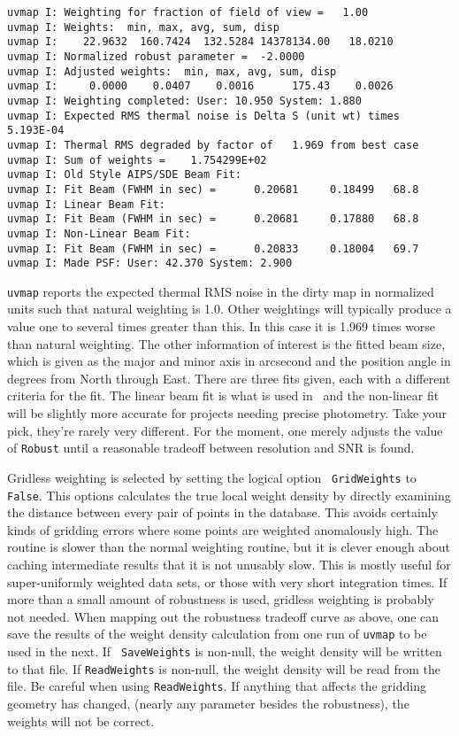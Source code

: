 \begin{verbatim}
uvmap I: Weighting for fraction of field of view =   1.00
uvmap I: Weights:  min, max, avg, sum, disp
uvmap I:    22.9632  160.7424  132.5284 14378134.00   18.0210
uvmap I: Normalized robust parameter =  -2.0000
uvmap I: Adjusted weights:  min, max, avg, sum, disp
uvmap I:     0.0000    0.0407    0.0016      175.43    0.0026
uvmap I: Weighting completed: User: 10.950 System: 1.880
uvmap I: Expected RMS thermal noise is Delta S (unit wt) times  5.193E-04
uvmap I: Thermal RMS degraded by factor of   1.969 from best case
uvmap I: Sum of weights =    1.754299E+02
uvmap I: Old Style AIPS/SDE Beam Fit:
uvmap I: Fit Beam (FWHM in sec) =      0.20681     0.18499   68.8
uvmap I: Linear Beam Fit:
uvmap I: Fit Beam (FWHM in sec) =      0.20681     0.17880   68.8
uvmap I: Non-Linear Beam Fit:
uvmap I: Fit Beam (FWHM in sec) =      0.20833     0.18004   69.7
uvmap I: Made PSF: User: 42.370 System: 2.900
\end{verbatim}

{\tt uvmap} reports the expected thermal RMS noise in the dirty map in
normalized units such that natural weighting is 1.0.  Other weightings will
typically produce a value one to several times greater than this.  In this
case it is 1.969 times worse than natural weighting.  The other information
of interest is the fitted beam size, which is given as the major and minor
axis in arcsecond and the position angle in degrees from North through
East.  There are three fits given, each with a different criteria for the
fit.  The linear beam fit is what is used in \aips\ and the non-linear fit
will be slightly more accurate for projects needing precise photometry.
Take your pick, they're rarely very different.  For the moment, one merely
adjusts the value of {\tt Robust} until a reasonable tradeoff between
resolution and SNR is found.

Gridless weighting is selected by setting the logical option {\tt
GridWeights} to {\tt False}.  This options calculates the true local weight
density by directly examining the distance between every pair of points in
the database.  This avoids certainly kinds of gridding errors where some
points are weighted anomalously high.  The routine is slower than the
normal weighting routine, but it is clever enough about caching
intermediate results that it is not unusably slow.  This is mostly useful
for super-uniformly weighted data sets, or those with very short
integration times.  If more than a small amount of robustness is used,
gridless weighting is probably not needed.  When mapping out the robustness
tradeoff curve as above, one can save the results of the weight density
calculation from one run of {\tt uvmap} to be used in the next.  If {\tt
SaveWeights} is non-null, the weight density will be written to that file.
If {\tt ReadWeights} is non-null, the weight density will be read from the
file.  Be careful when using {\tt ReadWeights}.  If anything that affects
the gridding geometry has changed, (nearly any parameter besides the
robustness), the weights will not be correct.

